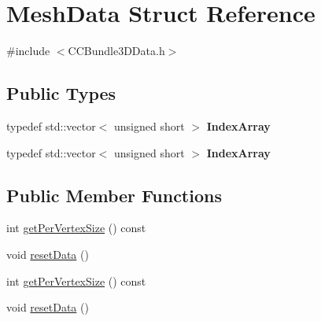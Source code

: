 \hypertarget{structMeshData}{}\section{Mesh\+Data Struct Reference}
\label{structMeshData}


{\ttfamily \#include $<$C\+C\+Bundle3\+D\+Data.\+h$>$}

\subsection*{Public Types}
\begin{DoxyCompactItemize}
\item 
\mbox{\label{structMeshData_af3b56bed1086cff77ebe25536feb7cdb}} 
typedef std\+::vector$<$ unsigned short $>$ {\bfseries Index\+Array}
\item 
\mbox{\label{structMeshData_af3b56bed1086cff77ebe25536feb7cdb}} 
typedef std\+::vector$<$ unsigned short $>$ {\bfseries Index\+Array}
\end{DoxyCompactItemize}
\subsection*{Public Member Functions}
\begin{DoxyCompactItemize}
\item 
int \hyperlink{structMeshData_ae20d2a9e24fc7f28a873b264bc85236a}{get\+Per\+Vertex\+Size} () const
\item 
void \hyperlink{structMeshData_adea2eaa8437f832a94e288862087845b}{reset\+Data} ()
\item 
int \hyperlink{structMeshData_ae20d2a9e24fc7f28a873b264bc85236a}{get\+Per\+Vertex\+Size} () const
\item 
void \hyperlink{structMeshData_adea2eaa8437f832a94e288862087845b}{reset\+Data} ()
\end{DoxyCompactItemize}
